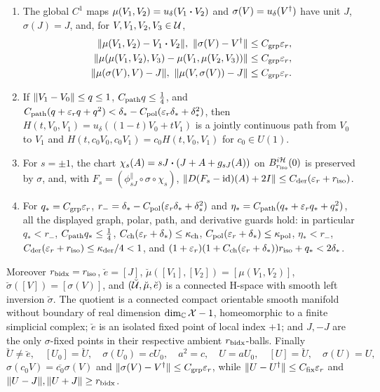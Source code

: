 \begin{lemma}
\begin{enumerate}
$(u_\delta,h_\delta)$ satisfying $X=u_\delta(X)\bdot h_\delta(X)$ and
$(u_\delta(V),h_\delta(V))=(V,J)$ for $V\in\Unit$.
\item[(A$_5$)] The global $C^1$ maps
$\mu(V_1,V_2)=u_\delta(V_1\mathbin{\bm{\cdot}} V_2)$ and $\sigma(V)=u_\delta(V^{\dagger})$ have unit $J$,
$\sigma(J)=J$, and, for $V,V_1,V_2,V_3\in\mathcal U$,
\begin{align*}
 \lVert \mu(V_1,V_2)-V_1\mathbin{\bm{\cdot}} V_2\rVert,\ \lVert \sigma(V)-V^{\dagger}\rVert&\le C_{\rm grp}\varepsilon_r,\\
 \lVert \mu(\mu(V_1,V_2),V_3)-\mu(V_1,\mu(V_2,V_3))\rVert&\le C_{\rm grp}\varepsilon_r,\\
 \lVert \mu(\sigma(V),V)-J\rVert,\ \lVert \mu(V,\sigma(V))-J\rVert&\le C_{\rm grp}\varepsilon_r.
\end{align*}
\item[(A$_6$)] If $\lVert V_1-V_0\rVert\le q\le1$, $C_{\rm path}q\le\tfrac14$, and
$C_{\rm path}(q+\varepsilon_rq+q^2)<\delta_*-C_{\rm pol}(\varepsilon_r\delta_*+\delta_*^2)$, then
$H(t,V_0,V_1)=u_\delta((1-t)V_0+tV_1)$ is a jointly continuous path from $V_0$ to $V_1$
and $H(t,c_0V_0,c_0V_1)=c_0H(t,V_0,V_1)$ for $c_0\in U(1)$.
\item[(A$_7$)] For $s=\pm1$, the chart
$\chi_s(A)=sJ\mathbin{\bm{\cdot}}(J+A+g_{sJ}(A))$ on $B_{r_{\rm iso}}^{i\mathcal H}(0)$ is preserved by
$\sigma$, and, with $F_s=(\phi_{sJ}^{\parallel}\circ\sigma\circ\chi_s)$,
$\lVert D(F_s-\mathrm{id})(A)+2I\rVert\le C_{\rm der}(\varepsilon_r+r_{\rm iso})$.
\item[(R)] For $q_*=C_{\rm grp}\varepsilon_r$,
$r_-=\delta_*-C_{\rm pol}(\varepsilon_r\delta_*+\delta_*^2)$ and
$\eta_*=C_{\rm path}(q_*+\varepsilon_rq_*+q_*^2)$, all the displayed graph, polar, path, and
derivative guards hold: in particular $q_*<r_-$, $C_{\rm path}q_*\le\tfrac14$,
$C_{\rm ch}(\varepsilon_r+\delta_*)\le\kappa_{\rm ch}$,
$C_{\rm pol}(\varepsilon_r+\delta_*)\le\kappa_{\rm pol}$, $\eta_*<r_-$,
$C_{\rm der}(\varepsilon_r+r_{\rm iso})\le\kappa_{\rm der}/4<1$, and
$(1+\varepsilon_r)(1+C_{\rm ch}(\varepsilon_r+\delta_*))r_{\rm iso}+q_*<2\delta_*$.
\end{enumerate}
Moreover $r_{\rm bidx}=r_{\rm iso}$, $\breve e=[J]$,
$\breve\mu([V_1],[V_2])=[\mu(V_1,V_2)]$, $\breve\sigma([V])=[\sigma(V)]$, and
$(\breve{\mathcal U},\breve\mu,\breve e)$ is a connected H-space with smooth left inversion
$\breve\sigma$.  The quotient is a connected compact orientable smooth manifold without
boundary of real dimension $\dim_{\mathbb C}\mathcal X-1$, homeomorphic to a finite simplicial
complex; $\breve e$ is an isolated fixed point of local index $+1$; and $J,-J$ are the only
$\sigma$-fixed points in their respective ambient $r_{\rm bidx}$-balls.  Finally
\[
 \breve U\ne\breve e,\quad [U_0]=\breve U,\quad \sigma(U_0)=cU_0,\quad a^2=c,\quad
 U=aU_0,\quad [U]=\breve U,\quad \sigma(U)=U,
\]
$\sigma(c_0V)=\overline{c_0}\sigma(V)$ and
$\lVert \sigma(V)-V^{\dagger}\rVert\le C_{\rm grp}\varepsilon_r$, while
$\lVert U-U^{\dagger}\rVert\le C_{\rm fix}\varepsilon_r$ and
$\lVert U-J\rVert,\lVert U+J\rVert\ge r_{\rm bidx}$.
\end{lemma}

